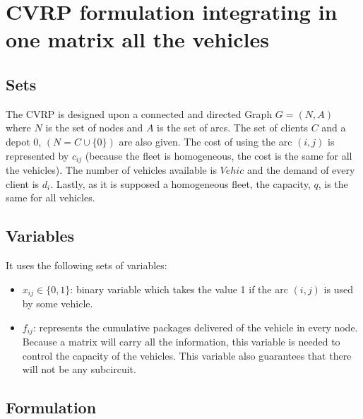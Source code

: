\documentclass[preprint,review,12pt]{elsarticle}
\begin{document}
\section{CVRP formulation integrating in one matrix all the vehicles}

\subsection{Sets}
The CVRP is designed upon a connected and directed Graph $G = (N,A)$ where $N$ is the set of nodes and $A$ is the set of arcs. The set of clients $C$ and a depot $0$, $(N=C \cup \{0\})$ are also given. The cost of using the arc $(i,j)$ is represented by $c_{ij}$ (because the fleet is homogeneous, the cost is the same for all the vehicles). The number of vehicles available is $Vehic$ and the demand of every client is $d_i$. Lastly, as it is supposed a homogeneous fleet, the capacity, $q$, is the same for all vehicles.

\subsection{Variables}
It uses the following sets of variables:

\begin{itemize}
	\item  $x_{ij}  \in  \{ 0,1 \}$: binary variable which takes the value 1 if the arc $(i,j)$ is used by some vehicle.
	\item $f_{ij}$: represents the cumulative packages delivered of the vehicle in every node. Because a matrix will carry all the information, this variable is needed to control the capacity of the vehicles. This variable also guarantees that there will not be any subcircuit.
\end{itemize}

\subsection{Formulation}
\end{document}

